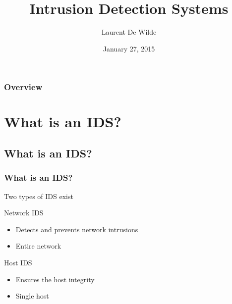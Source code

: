 \documentclass{beamer}
\title[NIDS]{Intrusion Detection Systems} %
\author{Laurent De Wilde} %
\institute[VUB] %
{
Vrije Universiteit Brussel \\ 
Faculty of Science and Bio - Engineering Sciences \\
Department of Computer Science \\%
\medskip
\textit{laudewil@vub.ac.be} %
}
\date{January 27, 2015} %
\begin{document}
\begin{frame}
\titlepage %
\end{frame}

\begin{frame}
\frametitle{Overview} %
\tableofcontents %
\end{frame}


\section{What is an IDS?} %


\subsection*{What is an IDS?}

\begin{frame}
\frametitle{What is an IDS?}
Two types of IDS exist
\begin{block}{Network IDS}
	\begin{itemize}
	\item Detects and prevents network intrusions
	\item Entire network 
	\end{itemize}
\end{block}
\begin{block}{Host IDS}
	\begin{itemize}
	\item Ensures the host integrity
	\item Single host
	\end{itemize}
\end{block}

\end{frame}
\end{document}
